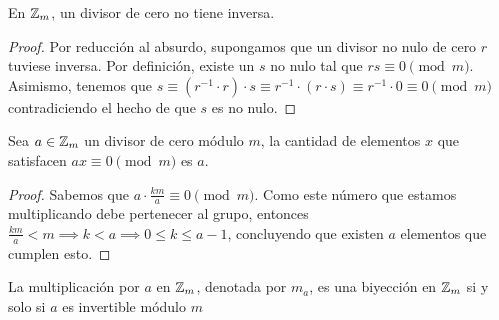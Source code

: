 \documentclass[main.tex]{subfiles}
\begin{document}
\begin{theorem}
    En $\mathbb Z_m$, un divisor de cero no tiene inversa.
\end{theorem}

\begin{proof}
    Por reducci\'on al absurdo, supongamos que un divisor no nulo de cero $r$ tuviese inversa. Por definici\'on, existe un $s$ no nulo tal que $rs \equiv 0 \pmod{m}$. Asimismo, tenemos que $s \equiv (r^{-1} \cdot r)\cdot s \equiv r^{-1}\cdot(r \cdot s) \equiv r^{-1} \cdot 0 \equiv 0 \pmod{m}$ contradiciendo el hecho de que $s$ es no nulo.
\end{proof}

\begin{theorem}
    Sea $a \in \mathbb Z_m$ un divisor de cero m\'odulo $m$, la cantidad de elementos $x$ que satisfacen $ax \equiv 0 \pmod{m}$ es $a$.
\end{theorem}

\begin{proof}
    Sabemos que $a \cdot \frac{km}{a} \equiv 0 \pmod{m}$. Como este n\'umero que estamos multiplicando debe pertenecer al grupo, entonces $\frac{km}{a} < m \implies k < a \implies 0 \leq k \leq a - 1$, concluyendo que existen $a$ elementos que cumplen esto.
\end{proof}

\begin{theorem}
    La multiplicaci\'on por $a$ en $\mathbb Z_m$, denotada por $m_a$, es una biyecci\'on en $\mathbb Z_m$ si y solo si $a$ es invertible m\'odulo $m$
\end{theorem}
\end{document}
